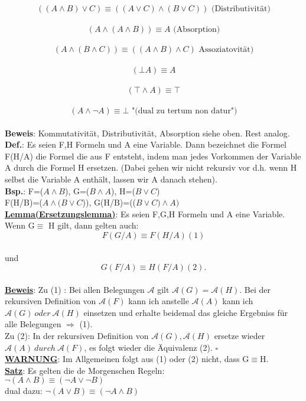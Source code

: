 \documentclass[a4paper]{scrartcl}
\begin{document}
$$((A\land B) \lor C) \equiv ((A \lor C ) \land (B\lor C)) \text{~(Distributivität)}$$\\
$$(A \land (A \land B )) \equiv A \text{~(Absorption)}$$\\
$$(A \land (B \land C )) \equiv ((A\land B ) \land C) \text{~Assoziatovität)}$$\\
$$(\bot A) \equiv A$$ \\
$$(\top \land A) \equiv \top$$\\
$$(A \land \neg A) \equiv \bot \text{~"(dual zu tertum non datur")}$$\\
\textbf{Beweis}: Kommutativität, Distributivität, Absorption siehe oben. Rest analog.\\
\textbf{Def.}: Es seien F,H Formeln und A eine Variable. Dann bezeichnet die Formel F(H/A) die Formel die aus F entsteht, indem man jedes Vorkommen der Variable A durch die Formel H ersetzen. (Dabei gehen wir nicht rekursiv vor d.h. wenn H selbst die Variable A enthält, lassen wir A danach stehen).\\
\textbf{Bsp.}: F=($A\land B$), G=($B\land A$), H=($B\lor C$)\\
F(H/B)=($A\land (B\lor C$)), G(H/B)=(($B\lor C) \land A)$\\
\textbf{\underline{Lemma(Ersetzungslemma)}}: Es seien F,G,H Formeln und A eine Variable. Wenn G$\equiv$ H gilt, dann gelten auch:\\
$$F(G/A) \equiv F(H/A)(1)$$\\ und $$G(F/A) \equiv H(F/A)(2).$$\\
\textbf{\underline{Beweis}}: Zu (1) : Bei allen Belegungen $\mathcal{A}$ gilt $\mathcal{A}(G)=\mathcal{A}(H)$. Bei der rekursiven Definition von $\mathcal{A}(F)$ kann ich anstelle $\mathcal{A}(A)$ kann ich $\mathcal{A}(G)~oder~\mathcal{A}(H)$ einsetzen und erhalte beidemal das gleiche Ergebniss für alle Belegungen $\Rightarrow$ (1).\\
Zu (2): In der rekursiven Definition von $\mathcal{A}(G),\mathcal{A}(H)$ ersetze wieder $\mathcal{A}(A)~durch~\mathcal{A}(F)$, es folgt wieder die Äquivalenz (2). $\square$\\
\textbf{\underline{WARNUNG}}: Im Allgemeinen folgt aus (1) oder (2) nicht, dass G$\equiv$H.\\
\textbf{\underline{Satz}}: Es gelten die de Morgenschen Regeln:\\
$\neg(A\land B) \equiv (\neg A \lor \neg B)$\\
dual dazu: $\neg(A \lor B) \equiv (\neg A \land B )$\\
\end{document}
